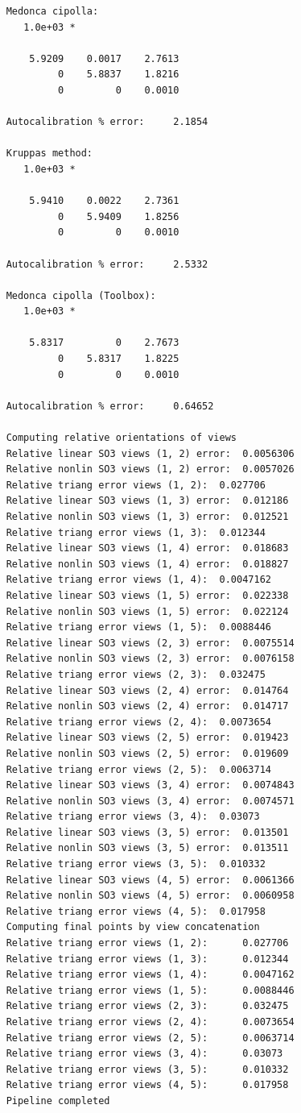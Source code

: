 \documentclass[11pt]{article}
\begin{document}
\begin{verbatim}
    Medonca cipolla: 
       1.0e+03 *
    
        5.9209    0.0017    2.7613
             0    5.8837    1.8216
             0         0    0.0010
    
    Autocalibration % error:	 2.1854 
    
    Kruppas method: 
       1.0e+03 *
    
        5.9410    0.0022    2.7361
             0    5.9409    1.8256
             0         0    0.0010
    
    Autocalibration % error:	 2.5332 
    
    Medonca cipolla (Toolbox): 
       1.0e+03 *
    
        5.8317         0    2.7673
             0    5.8317    1.8225
             0         0    0.0010
    
    Autocalibration % error:	 0.64652 
    
    Computing relative orientations of views
    Relative linear SO3 views (1, 2) error:	 0.0056306 
    Relative nonlin SO3 views (1, 2) error:	 0.0057026 
    Relative triang error views (1, 2):	 0.027706 
    Relative linear SO3 views (1, 3) error:	 0.012186 
    Relative nonlin SO3 views (1, 3) error:	 0.012521 
    Relative triang error views (1, 3):	 0.012344 
    Relative linear SO3 views (1, 4) error:	 0.018683 
    Relative nonlin SO3 views (1, 4) error:	 0.018827 
    Relative triang error views (1, 4):	 0.0047162 
    Relative linear SO3 views (1, 5) error:	 0.022338 
    Relative nonlin SO3 views (1, 5) error:	 0.022124 
    Relative triang error views (1, 5):	 0.0088446 
    Relative linear SO3 views (2, 3) error:	 0.0075514 
    Relative nonlin SO3 views (2, 3) error:	 0.0076158 
    Relative triang error views (2, 3):	 0.032475 
    Relative linear SO3 views (2, 4) error:	 0.014764 
    Relative nonlin SO3 views (2, 4) error:	 0.014717 
    Relative triang error views (2, 4):	 0.0073654 
    Relative linear SO3 views (2, 5) error:	 0.019423 
    Relative nonlin SO3 views (2, 5) error:	 0.019609 
    Relative triang error views (2, 5):	 0.0063714 
    Relative linear SO3 views (3, 4) error:	 0.0074843 
    Relative nonlin SO3 views (3, 4) error:	 0.0074571 
    Relative triang error views (3, 4):	 0.03073 
    Relative linear SO3 views (3, 5) error:	 0.013501 
    Relative nonlin SO3 views (3, 5) error:	 0.013511 
    Relative triang error views (3, 5):	 0.010332 
    Relative linear SO3 views (4, 5) error:	 0.0061366 
    Relative nonlin SO3 views (4, 5) error:	 0.0060958 
    Relative triang error views (4, 5):	 0.017958 
    Computing final points by view concatenation
    Relative triang error views (1, 2):		 0.027706 
    Relative triang error views (1, 3):		 0.012344 
    Relative triang error views (1, 4):		 0.0047162 
    Relative triang error views (1, 5):		 0.0088446 
    Relative triang error views (2, 3):		 0.032475 
    Relative triang error views (2, 4):		 0.0073654 
    Relative triang error views (2, 5):		 0.0063714 
    Relative triang error views (3, 4):		 0.03073 
    Relative triang error views (3, 5):		 0.010332 
    Relative triang error views (4, 5):		 0.017958 
    Pipeline completed
\end{verbatim}
\end{document}
